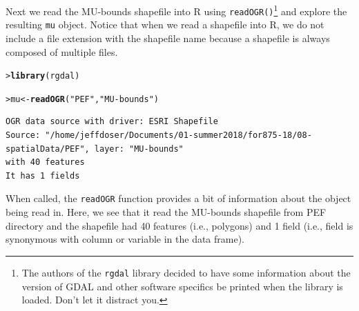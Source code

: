 \documentclass[12pt,oneside]{book}\usepackage[]{graphicx}\usepackage[]{color}
\makeatletter
\newcommand{\hlstr}[1]{\textcolor[rgb]{0.192,0.494,0.8}{#1}}%
\newcommand{\hlstd}[1]{\textcolor[rgb]{0.345,0.345,0.345}{#1}}%
\newcommand{\hlkwb}[1]{\textcolor[rgb]{0.69,0.353,0.396}{#1}}%
\newcommand{\hlkwd}[1]{\textcolor[rgb]{0.737,0.353,0.396}{\textbf{#1}}}%
\newenvironment{kframe}{%
 \def\at@end@of@kframe{}%
 \ifinner\ifhmode%
  \def\at@end@of@kframe{\end{minipage}}%
  \begin{minipage}{\columnwidth}%
 \fi\fi%
 \def\FrameCommand##1{\hskip\@totalleftmargin \hskip-\fboxsep
 \colorbox{shadecolor}{##1}\hskip-\fboxsep
     \hskip-\linewidth \hskip-\@totalleftmargin \hskip\columnwidth}%
 \MakeFramed {\advance\hsize-\width
   \@totalleftmargin\z@ \linewidth\hsize
   \@setminipage}}%
 {\par\unskip\endMakeFramed%
 \at@end@of@kframe}
\newenvironment{knitrout}{}{} %
\makeatother
\begin{document}
Next we read the MU-bounds shapefile into R using \verb+readOGR()+\footnote{The authors of the \texttt{rgdal} library decided to have some information about the version of GDAL and other software specifics be printed when the library is loaded. Don't let it distract you.} and explore the resulting \verb+mu+ object. Notice that when we read a shapefile into R, we do not include a file extension with the shapefile name because a shapefile is always composed of multiple files.
\begin{knitrout}
\color{fgcolor}\begin{kframe}
\begin{alltt}
\hlstd{> }\hlkwd{library}\hlstd{(rgdal)}
\end{alltt}


{\ttfamily\noindent\itshape\color{messagecolor}{rgdal: version: 1.2-20, (SVN revision 725)\\ Geospatial Data Abstraction Library extensions to R successfully loaded\\ Loaded GDAL runtime: GDAL 2.2.3, released 2017/11/20\\ Path to GDAL shared files: /usr/share/gdal/2.2\\ GDAL binary built with GEOS: TRUE \\ Loaded PROJ.4 runtime: Rel. 4.9.3, 15 August 2016, [PJ\_VERSION: 493]\\ Path to PROJ.4 shared files: (autodetected)\\ Linking to sp version: 1.2-7 }}\begin{alltt}
\hlstd{> }\hlstd{mu} \hlkwb{<-} \hlkwd{readOGR}\hlstd{(}\hlstr{"PEF"}\hlstd{,} \hlstr{"MU-bounds"}\hlstd{)}
\end{alltt}
\begin{verbatim}
OGR data source with driver: ESRI Shapefile 
Source: "/home/jeffdoser/Documents/01-summer2018/for875-18/08-spatialData/PEF", layer: "MU-bounds"
with 40 features
It has 1 fields
\end{verbatim}
\end{kframe}
\end{knitrout}
When called, the \verb+readOGR+ function provides a bit of information about the object being read in. Here, we see that it read the MU-bounds shapefile from PEF directory and the shapefile had 40 features (i.e., polygons) and 1 field (i.e., field is synonymous with column or variable in the data frame).
\end{document}
